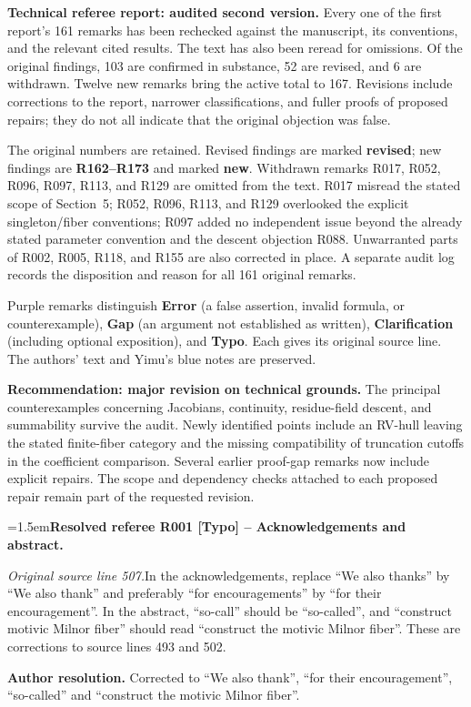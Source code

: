 \documentclass[12pt]{amsart}
\newcommand{\ResolvedRefereeRemark}[5]{%
  \par\medskip\begingroup\normalfont\small\color{gray}%
  \emergencystretch=1.5em\noindent\textbf{Resolved referee R#1 [#2] -- #3.}\par\nobreak\noindent #4\par
  \medskip\color{ResolutionGreen}\noindent\textbf{Author resolution.} #5\par
  \endgroup\medskip
}
\theoremstyle{plain}
\theoremstyle{definition}
\theoremstyle{remark}
\numberwithin{equation}{section}
\theoremstyle{plain}
\newcommand{\0}{\emptyset}
\begin{document}
{\normalfont\small\color{RefereePurple}
\noindent\textbf{Technical referee report: audited second version.}
Every one of the first report's 161 remarks has been rechecked against the manuscript, its conventions, and the relevant cited results. The text has also been reread for omissions. Of the original findings, 103 are confirmed in substance, 52 are revised, and 6 are withdrawn. Twelve new remarks bring the active total to 167. Revisions include corrections to the report, narrower classifications, and fuller proofs of proposed repairs; they do not all indicate that the original objection was false.
\par\smallskip
The original numbers are retained. Revised findings are marked \textbf{revised}; new findings are \textbf{R162--R173} and marked \textbf{new}. Withdrawn remarks R017, R052, R096, R097, R113, and R129 are omitted from the text. R017 misread the stated scope of Section~5; R052, R096, R113, and R129 overlooked the explicit singleton/fiber conventions; R097 added no independent issue beyond the already stated parameter convention and the descent objection R088. Unwarranted parts of R002, R005, R118, and R155 are also corrected in place. A separate audit log records the disposition and reason for all 161 original remarks.
\par\smallskip
Purple remarks distinguish \textbf{Error} (a false assertion, invalid formula, or counterexample), \textbf{Gap} (an argument not established as written), \textbf{Clarification} (including optional exposition), and \textbf{Typo}. Each gives its original source line. The authors' text and Yimu's blue notes are preserved.
\par\smallskip
\noindent\textbf{Recommendation: major revision on technical grounds.}
The principal counterexamples concerning Jacobians, continuity, residue-field descent, and summability survive the audit. Newly identified points include an RV-hull leaving the stated finite-fiber category and the missing compatibility of truncation cutoffs in the coefficient comparison. Several earlier proof-gap remarks now include explicit repairs. The scope and dependency checks attached to each proposed repair remain part of the requested revision.
\par}

\ResolvedRefereeRemark{001}{Typo}{Acknowledgements and abstract}{%
\textit{Original source line 507.}\quad In the acknowledgements, replace ``We also thanks'' by ``We also thank'' and preferably ``for encouragements'' by ``for their encouragement''. In the abstract, ``so-call'' should be ``so-called'', and ``construct motivic Milnor fiber'' should read ``construct the motivic Milnor fiber''. These are corrections to source lines 493 and 502.
}{Corrected to ``We also thank'', ``for their encouragement'', ``so-called'' and ``construct the motivic Milnor fiber''.}
\end{document}
